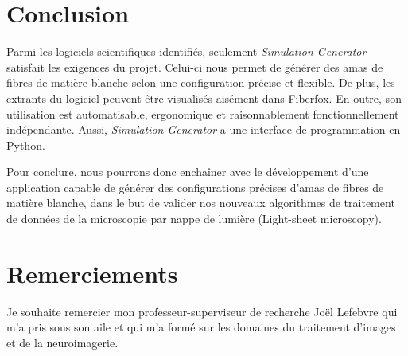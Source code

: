 \documentclass{article}
\begin{document}
  \section{Conclusion}
  \label{sec:conclusion}
  Parmi les logiciels scientifiques identifiés, seulement \textit{Simulation Generator} satisfait les exigences du projet.
  Celui-ci nous permet de générer des amas de fibres de matière blanche selon une configuration précise et flexible.
  De plus, les extrants du logiciel peuvent être visualisés aisément dans Fiberfox.
  En outre, son utilisation est automatisable, ergonomique et raisonnablement fonctionnellement indépendante.
  Aussi, \textit{Simulation Generator} a une interface de programmation en Python.

  Pour conclure, nous pourrons donc enchaîner avec le développement d'une application capable de générer des configurations précises d'amas de fibres de matière
  blanche, dans le but de valider nos nouveaux algorithmes de traitement de données de la microscopie par nappe de lumière (Light-sheet microscopy).


  \section*{Remerciements}
  \label{sec:thanks}
  Je souhaite remercier mon professeur-superviseur de recherche Joël Lefebvre qui m'a pris sous son aile et qui m'a formé sur les domaines du traitement d'images et
  de la neuroimagerie.


  
  
\end{document}

